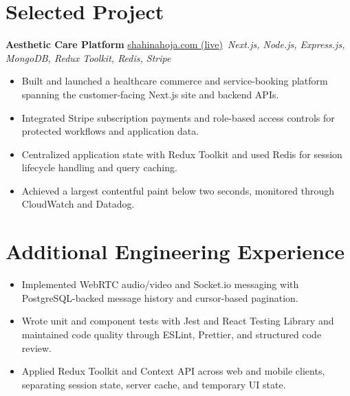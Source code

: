 \documentclass[11pt,a4paper,sans]{moderncv}
\begin{document}
\vspace{3pt}


\section{Selected Project}
\vspace{1pt}
\textbf{Aesthetic Care Platform} \hfill \href{https://shahinahoja.com/}{shahinahoja.com (live)}\
\textit{Next.js, Node.js, Express.js, MongoDB, Redux Toolkit, Redis, Stripe}
\begin{itemize}
\item {Built and launched a healthcare commerce and service-booking platform spanning the customer-facing Next.js site and backend APIs.}
\item {Integrated Stripe subscription payments and role-based access controls for protected workflows and application data.}
\item {Centralized application state with Redux Toolkit and used Redis for session lifecycle handling and query caching.}
\item {Achieved a largest contentful paint below two seconds, monitored through CloudWatch and Datadog.}
\end{itemize}

\section{Additional Engineering Experience}
\vspace{1pt}
\begin{itemize}
    \item {Implemented WebRTC audio/video and Socket.io messaging with PostgreSQL-backed message history and cursor-based pagination.}
    \item {Wrote unit and component tests with Jest and React Testing Library and maintained code quality through ESLint, Prettier, and structured code review.}
    \item {Applied Redux Toolkit and Context API across web and mobile clients, separating session state, server cache, and temporary UI state.}
\end{itemize}
\end{document}
